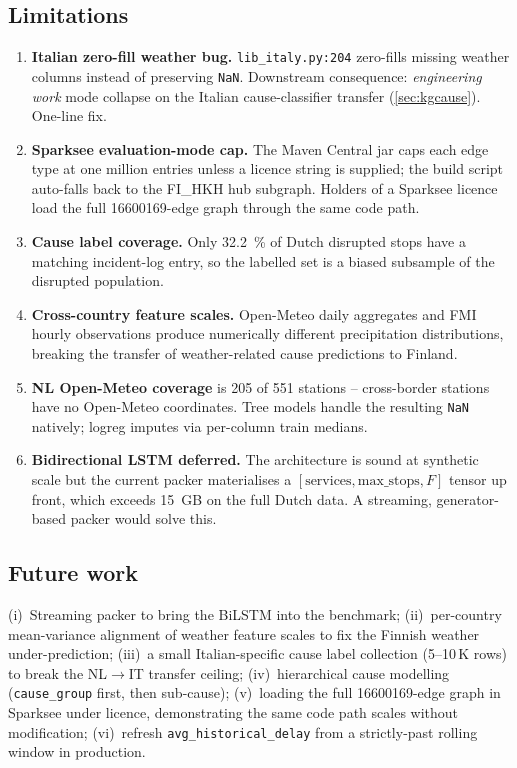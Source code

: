 \subsection{Limitations}

\begin{enumerate}
    \item \textbf{Italian zero-fill weather bug.} \texttt{lib\_italy.py:204} zero-fills missing weather columns instead of preserving \texttt{NaN}. Downstream consequence: \emph{engineering work} mode collapse on the Italian cause-classifier transfer (\cref{sec:kgcause}). One-line fix.
    \item \textbf{Sparksee evaluation-mode cap.} The Maven Central jar caps each edge type at one million entries unless a licence string is supplied; the build script auto-falls back to the FI\_HKH hub subgraph. Holders of a Sparksee licence load the full \num{16600169}-edge graph through the same code path.
    \item \textbf{Cause label coverage.} Only \SI{32.2}{\percent} of Dutch disrupted stops have a matching incident-log entry, so the labelled set is a biased subsample of the disrupted population.
    \item \textbf{Cross-country feature scales.} Open-Meteo daily aggregates and FMI hourly observations produce numerically different precipitation distributions, breaking the transfer of weather-related cause predictions to Finland.
    \item \textbf{NL Open-Meteo coverage} is 205 of 551 stations -- cross-border stations have no Open-Meteo coordinates. Tree models handle the resulting \texttt{NaN} natively; logreg imputes via per-column train medians.
    \item \textbf{Bidirectional LSTM deferred.} The architecture is sound at synthetic scale but the current packer materialises a $[\text{services}, \text{max\_stops}, F]$ tensor up front, which exceeds \SI{15}{GB} on the full Dutch data. A streaming, generator-based packer would solve this.
\end{enumerate}

\subsection{Future work}

(i)~Streaming packer to bring the BiLSTM into the benchmark; (ii)~per-country mean-variance alignment of weather feature scales to fix the Finnish weather under-prediction; (iii)~a small Italian-specific cause label collection (5--10\,K rows) to break the NL$\to$IT transfer ceiling; (iv)~hierarchical cause modelling (\texttt{cause\_group} first, then sub-cause); (v)~loading the full \num{16600169}-edge graph in Sparksee under licence, demonstrating the same code path scales without modification; (vi)~refresh \texttt{avg\_historical\_delay} from a strictly-past rolling window in production.

